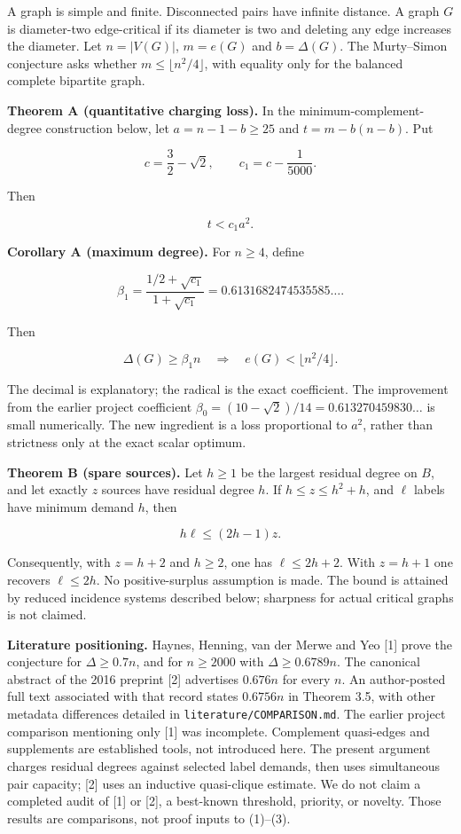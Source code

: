 \documentclass[
  11pt,
  a4paper,
]{article}
\begin{document}
A graph is simple and finite. Disconnected pairs have infinite distance.
A graph \(G\) is diameter-two edge-critical if its diameter is two and
deleting any edge increases the diameter. Let \(n=|V(G)|\), \(m=e(G)\)
and \(b=\Delta(G)\). The Murty--Simon conjecture asks whether
\(m\le\lfloor n^2/4\rfloor\), with equality only for the balanced
complete bipartite graph.

\textbf{Theorem A (quantitative charging loss).} In the
minimum-complement-degree construction below, let \(a=n-1-b\ge25\) and
\(t=m-b(n-b)\). Put

\[c=\frac32-\sqrt2,\qquad c_1=c-\frac1{5000}.\]

Then

\[\boxed{t<c_1a^2.} \tag{1}\]

\textbf{Corollary A (maximum degree).} For \(n\ge4\), define

\[\beta_1=\frac{1/2+\sqrt{c_1}}{1+\sqrt{c_1}}=0.6131682474535585\ldots.\]

Then

\[\boxed{\Delta(G)\ge\beta_1n\quad\Longrightarrow\quad e(G)<\lfloor n^2/4\rfloor.} \tag{2}\]

The decimal is explanatory; the radical is the exact coefficient. The
improvement from the earlier project coefficient
\(\beta_0=(10-\sqrt2)/14=0.613270459830\ldots\) is small numerically.
The new ingredient is a loss proportional to \(a^2\), rather than
strictness only at the exact scalar optimum.

\textbf{Theorem B (spare sources).} Let \(h\ge1\) be the largest
residual degree on \(B\), and let exactly \(z\) sources have residual
degree \(h\). If \(h\le z\le h^2+h\), and \(\ell\) labels have minimum
demand \(h\), then

\[\boxed{h\ell\le(2h-1)z.} \tag{3}\]

Consequently, with \(z=h+2\) and \(h\ge2\), one has \(\ell\le2h+2\).
With \(z=h+1\) one recovers \(\ell\le2h\). No positive-surplus
assumption is made. The bound is attained by reduced incidence systems
described below; sharpness for actual critical graphs is not claimed.

\textbf{Literature positioning.} Haynes, Henning, van der Merwe and Yeo
{[}1{]} prove the conjecture for \(\Delta\ge0.7n\), and for \(n\ge2000\)
with \(\Delta\ge0.6789n\). The canonical abstract of the 2016 preprint
{[}2{]} advertises \(0.676n\) for every \(n\). An author-posted full
text associated with that record states \(0.6756n\) in Theorem 3.5, with
other metadata differences detailed in
\texttt{literature/COMPARISON.md}. The earlier project comparison
mentioning only {[}1{]} was incomplete. Complement quasi-edges and
supplements are established tools, not introduced here. The present
argument charges residual degrees against selected label demands, then
uses simultaneous pair capacity; {[}2{]} uses an inductive quasi-clique
estimate. We do not claim a completed audit of {[}1{]} or {[}2{]}, a
best-known threshold, priority, or novelty. Those results are
comparisons, not proof inputs to (1)--(3).
\end{document}

